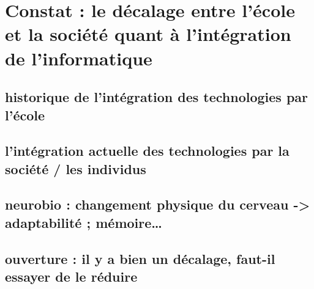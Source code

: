 
\chapter{Constat : le décalage entre l'école et la société quant à l'intégration de l'informatique}\label{historique}

\section{historique de l'intégration des technologies par l'école}

\section{l'intégration actuelle des technologies par la société / les individus}

\section{neurobio : changement physique du cerveau -> adaptabilité ; mémoire…}

\section{ouverture : il y a bien un décalage, faut-il essayer de le réduire}


